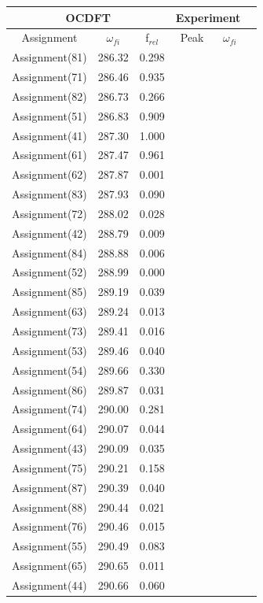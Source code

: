 \documentclass[12pt]{article}
\begin{document}
   \begin{table}
 \centering
     \begin{tabular}{c@{\hskip 0.22in}c@{\hskip 0.22in}c@{\hskip 0.52in}c@{\hskip 0.22in}c@{\hskip 0.22in}c}
     \hline
     \hline
   \multicolumn{3}{c}{OCDFT} &\multicolumn{2}{c}{Experiment} \\
   \hline
   Assignment & $\omega_{fi}$ & f$_{rel}$ & Peak &  $\omega_{fi}$   \\
   \hline
 Assignment(81) & 286.32 & 0.298 \\
 Assignment(71) & 286.46 & 0.935 \\
 Assignment(82) & 286.73 & 0.266 \\
 Assignment(51) & 286.83 & 0.909 \\
 Assignment(41) & 287.30 & 1.000 \\
 Assignment(61) & 287.47 & 0.961 \\
 Assignment(62) & 287.87 & 0.001 \\
 Assignment(83) & 287.93 & 0.090 \\
 Assignment(72) & 288.02 & 0.028 \\
 Assignment(42) & 288.79 & 0.009 \\
 Assignment(84) & 288.88 & 0.006 \\
 Assignment(52) & 288.99 & 0.000 \\
 Assignment(85) & 289.19 & 0.039 \\
 Assignment(63) & 289.24 & 0.013 \\
 Assignment(73) & 289.41 & 0.016 \\
 Assignment(53) & 289.46 & 0.040 \\
 Assignment(54) & 289.66 & 0.330 \\
 Assignment(86) & 289.87 & 0.031 \\
 Assignment(74) & 290.00 & 0.281 \\
 Assignment(64) & 290.07 & 0.044 \\
 Assignment(43) & 290.09 & 0.035 \\
 Assignment(75) & 290.21 & 0.158 \\
 Assignment(87) & 290.39 & 0.040 \\
 Assignment(88) & 290.44 & 0.021 \\
 Assignment(76) & 290.46 & 0.015 \\
 Assignment(55) & 290.49 & 0.083 \\
 Assignment(65) & 290.65 & 0.011 \\
 Assignment(44) & 290.66 & 0.060 \\

\end{tabular}
\end{table}
\end{document}
